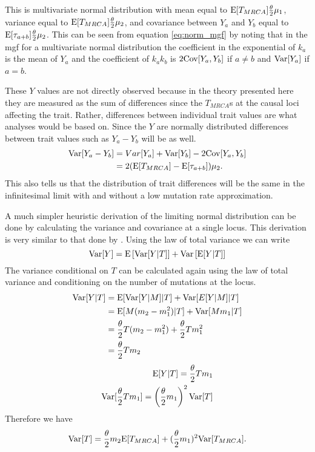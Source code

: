 This is multivariate normal distribution with mean equal to $\mathrm{E}[T_{MRCA}] \frac{\theta}{2} \mu_1$,
variance equal to $\mathrm{E}[T_{MRCA}] \frac{\theta}{2} \mu_2$, and covariance between $Y_a$ and $Y_b$
equal to $\mathrm{E}[\tau_{a+b}] \frac{\theta}{2} \mu_2$. This can be seen from equation
\eqref{eq:norm_mgf} by noting that in the mgf for a multivariate normal
distribution the coefficient in the exponential of $k_a$ is the mean of $Y_a$
and the coefficient of $k_ak_b$ is $2\mathrm{Cov}[Y_a,Y_b]$ if $a\neq b$ and $\mathrm{Var}[Y_a]$
if $a=b$.

These $Y$ values are not directly observed because in the theory presented here
they are measured as the sum of differences since the $T_{MRCA}$s at the causal
loci affecting the trait. Rather, differences between individual trait values
are what analyses would be based on. Since the $Y$ are normally distributed
differences between trait values such as $Y_a-Y_b$ will be as well.
\begin{align*}
  \mathrm{Var}[Y_a-Y_b] &= Var[Y_a] + \mathrm{Var}[Y_b] - 2\mathrm{Cov}[Y_a,Y_b]\\
                &= 2(\mathrm{E}[T_{MRCA}] - \mathrm{E}[\tau_{a+b}])\mu_2.
\end{align*}
This also tells us that the distribution of trait differences will be the same
in the infinitesimal limit with and without a low mutation rate approximation.

A much simpler heuristic derivation of the limiting normal distribution can be
done by calculating the variance and covariance at a single locus. This
derivation is very similar to that done by \citet{Schraiber2015}. Using the law
of total variance we can write
\begin{equation*}
  \mathrm{Var}[Y] = \mathrm{E}\left[\mathrm{Var}[Y|T]\right] +
  \mathrm{Var}\left[\mathrm{E}[Y|T]\right]
\end{equation*}
The variance conditional on $T$ can be calculated again using the law of total
variance and conditioning on the number of mutations at the locus. 
\begin{align*}
  \mathrm{Var}[Y|T] &= \mathrm{E}[\mathrm{Var}[Y|M]|T] + \mathrm{Var}[E[Y|M]|T]\\
            &= \mathrm{E}[M(m_2-m_1^2)|T] + \mathrm{Var}[Mm_1|T]\\
            &= \frac{\theta}{2} T (m_2-m_1^2) + \frac{\theta}{2} T m_1^2\\
            &= \frac{\theta}{2} T m_2
\end{align*}
\begin{align*}
  \mathrm{E}[Y|T] = \frac{\theta}{2} T m_1\\
  \mathrm{Var}[\frac{\theta}{2} T m_1] = \left( \frac{\theta}{2} m_1\right)^2\mathrm{Var}[T]
\end{align*}
Therefore we have
\begin{equation}
  \mathrm{Var}[T] = \frac{\theta}{2} m_2 \mathrm{E}[T_{MRCA}] + (\frac{\theta}{2} m_1)^2 \mathrm{Var}[T_{MRCA}].
\end{equation}

